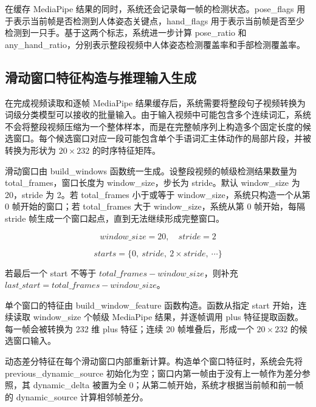 在缓存 MediaPipe 结果的同时，系统还会记录每一帧的检测状态。pose\_flags 用于表示当前帧是否检测到人体姿态关键点，hand\_flags 用于表示当前帧是否至少检测到一只手。基于这两个标志，系统进一步计算 pose\_ratio 和 any\_hand\_ratio，分别表示整段视频中人体姿态检测覆盖率和手部检测覆盖率。

\subsection{滑动窗口特征构造与推理输入生成}




在完成视频读取和逐帧 MediaPipe 结果缓存后，系统需要将整段句子视频转换为词级分类模型可以接收的批量输入。由于输入视频中可能包含多个连续词汇，系统不会将整段视频压缩为一个整体样本，而是在完整帧序列上构造多个固定长度的候选窗口。每个候选窗口对应一段可能包含单个手语词汇主体动作的局部片段，并被转换为形状为 $20\times232$ 的时序特征矩阵。

滑动窗口由 build\_windows 函数统一生成。设整段视频的帧级检测结果数量为 total\_frames，窗口长度为 window\_size，步长为 stride。默认 window\_size 为 20，stride 为 2。若 total\_frames 小于或等于 window\_size，系统只构造一个从第 0 帧开始的窗口；若 total\_frames 大于 window\_size，系统从第 0 帧开始，每隔 stride 帧生成一个窗口起点，直到无法继续形成完整窗口。

\begin{equation}
window\_size = 20,\quad stride = 2
\label{eq:chapter06-window-size-stride}
\end{equation}

\begin{equation}
starts = \{0,\ stride,\ 2\times stride,\ \cdots\}
\label{eq:chapter06-window-starts}
\end{equation}

若最后一个 start 不等于 $total\_frames - window\_size$，则补充 $last\_start = total\_frames - window\_size$。

单个窗口的特征由 build\_window\_feature 函数构造。函数从指定 start 开始，连续读取 window\_size 个帧级 MediaPipe 结果，并逐帧调用 plus 特征提取函数。每一帧会被转换为 232 维 plus 特征；连续 20 帧堆叠后，形成一个 $20\times232$ 的候选窗口输入。

动态差分特征在每个滑动窗口内部重新计算。构造单个窗口特征时，系统会先将 previous\_dynamic\_source 初始化为空；窗口内第一帧由于没有上一帧作为差分参照，其 dynamic\_delta 被置为全 0；从第二帧开始，系统才根据当前帧和前一帧的 dynamic\_source 计算相邻帧差分。

